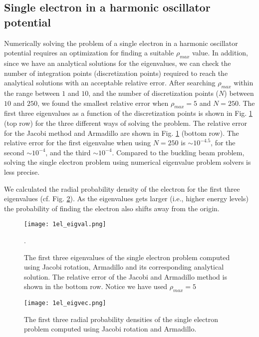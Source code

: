 \documentclass[a4paper]{article}
\begin{document}
\subsection{Single electron in a harmonic oscillator potential}
Numerically solving the problem of a single electron in a harmonic oscillator potential requires an optimization for finding a suitable $\rho_{max}$ value. In addition, since we have an analytical solutions for the eigenvalues, we can check the number of integration points (discretization points) required to reach the analytical solutions with an acceptable relative error. After searching $\rho_{max}$ within the range between $1$ and $10$, and the number of discretization points ($N$) between $10$ and $250$, we found the smallest relative error when $\rho_{max} = 5$ and $N=250$. The first three eigenvalues as a function of the discretization points is shown in Fig. \ref{1el_eigval} (top row) for the three different ways of solving the problem. The relative error for the Jacobi method and Armadillo are shown in Fig. \ref{1el_eigval} (bottom row). The relative error for the first eigenvalue when using $N=250$ is $\sim10^{-4.5}$, for the second $\sim10^{-4}$, and the third $\sim10^{-4}$. Compared to the buckling beam problem, solving the single electron problem using numerical eigenvalue problem solvers is less precise. 

We calculated the radial probability density of the electron for the first three eigenvalues (cf. Fig. \ref{1el_eigvec}). As the eigenvalues gets larger (i.e., higher energy levels) the probability of finding the electron also shifts away from the origin. 

\begin{figure}[H]
  \centering
  \texttt{[image: 1el\_eigval.png]}
  \caption{The first three eigenvalues of the single electron problem computed using Jacobi rotation, Armadillo and its corresponding analytical solution. The relative error of the Jacobi and Armadillo method is shown in the bottom row. Notice we have used $\rho_{max}=5$}.
   \label{1el_eigval}
\end{figure}
\begin{figure}[H]
  \centering
  \texttt{[image: 1el\_eigvec.png]}
  \caption{The first three radial probability densities of the single electron problem computed using Jacobi rotation and Armadillo.}
   \label{1el_eigvec}
\end{figure}
\end{document}
